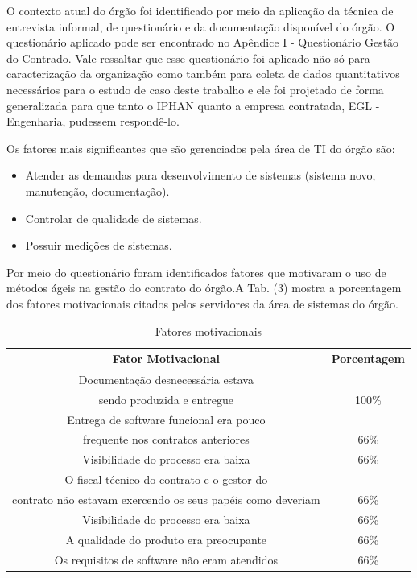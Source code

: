 O contexto atual do órgão foi identificado por meio da aplicação da técnica de entrevista informal, de questionário e da documentação disponível do órgão. O questionário aplicado pode ser encontrado no Apêndice I - Questionário Gestão do Contrado. Vale ressaltar que esse questionário foi aplicado não só para caracterização da organização como também para coleta de dados quantitativos necessários para o estudo de caso deste trabalho e ele foi projetado de forma generalizada para que tanto o IPHAN quanto a empresa contratada, EGL - Engenharia, pudessem respondê-lo.
 
Os fatores mais significantes que são gerenciados pela área de TI do órgão são:
\begin{itemize}
\item Atender as demandas para desenvolvimento de sistemas (sistema novo, manutenção, documentação).
\item Controlar de qualidade de sistemas.
\item Possuir medições de sistemas.
\end{itemize}

Por meio do questionário foram identificados fatores que motivaram o uso de métodos ágeis na gestão do contrato do órgão.A Tab. (3) mostra a porcentagem dos fatores motivacionais citados pelos servidores da área de sistemas do órgão. 

\begin{table}[H]
\center
\footnotesize
\begin{tabular}{|c|c|}
\hline
\textbf{Fator Motivacional}          & \textbf{Porcentagem}  \\ \hline
Documentação desnecessária estava \\ sendo produzida e entregue               &  100\%                 \\ \hline
Entrega de software funcional era pouco \\ frequente nos contratos anteriores        &  66\%                  \\ \hline
Visibilidade do processo era baixa              &  66\%                \\ \hline
O fiscal técnico do contrato e o gestor do \\ contrato não estavam exercendo os seus papéis como deveriam              &  66\%                \\ \hline
Visibilidade do processo era baixa              &  66\%                \\ \hline
A qualidade do produto era preocupante   &  66\%                \\ \hline
Os requisitos de software não eram atendidos &  66\%                \\ \hline
\end{tabular}
\caption{Fatores motivacionais}
\end{table}

